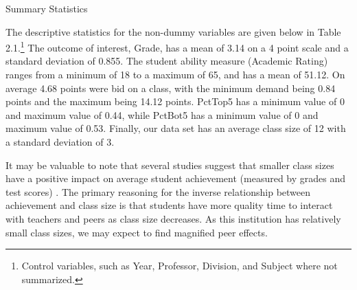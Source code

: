 \documentclass[12pt,a4paper,english,fleqn]{article}
\makeatletter
\renewcommand\subsection{\@startsection{subsection}{2}
{\z@}{-3.25ex\@plus -1ex \@minus -.2ex}{1.5ex \@plus .2ex}{\normalfont\bf}}
\makeatother
\begin{document}
\subsection{Summary Statistics}

The descriptive statistics for the non-dummy variables are given below in Table 2.1.\footnote{Control variables, such as Year, Professor, Division, and Subject where not summarized.} The outcome of interest, Grade, has a mean of 3.14 on a 4 point scale and a standard deviation of 0.855. The student ability measure (Academic Rating) ranges from a minimum of 18 to a maximum of 65, and has a mean of 51.12. On average 4.68 points were bid on a class, with the minimum demand being 0.84 points and the maximum being 14.12 points. PctTop5 has a minimum value of 0 and maximum value of 0.44, while PctBot5 has a minimum value of 0 and maximum value of 0.53. Finally, our data set has an average class size of 12 with a standard deviation of 3. 

It may be valuable to note that several studies suggest that smaller class sizes have a positive impact on average student achievement (measured by grades and test scores) \citep{diette2015class,kokkelenberg2008effects}. The primary reasoning for the inverse relationship between achievement and class size is that students have more quality time to interact with teachers and peers as class size decreases. As this institution has relatively small class sizes, we may expect to find magnified peer effects. 

\newpage{}



\end{document}
